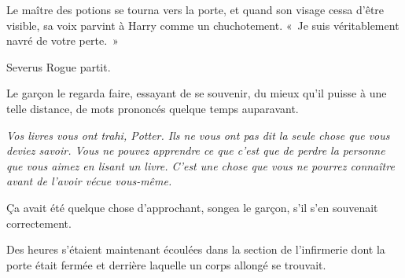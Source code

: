 Le maître des potions se tourna vers la porte, et quand son visage cessa d'être visible, sa voix parvint à Harry comme un chuchotement. «~Je suis véritablement navré de votre perte.~»

Severus Rogue partit.

Le garçon le regarda faire, essayant de se souvenir, du mieux qu'il puisse à une telle distance, de mots prononcés quelque temps auparavant.

\emph{Vos livres vous ont trahi, Potter. Ils ne vous ont pas dit la seule chose que vous deviez savoir. Vous ne pouvez apprendre ce que c'est que de perdre la personne que vous aimez en lisant un livre. C'est une chose que vous ne pourrez connaître avant de l'avoir vécue vous-même.}

Ça avait été quelque chose d'approchant, songea le garçon, s'il s'en souvenait correctement.

\later

Des heures s'étaient maintenant écoulées dans la section de l'infirmerie dont la porte était fermée et derrière laquelle un corps allongé se trouvait.


